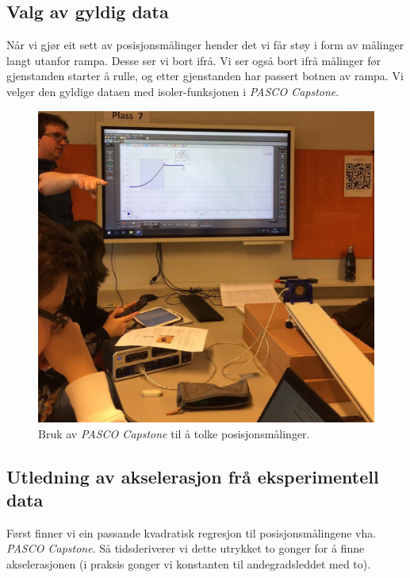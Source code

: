 \documentclass[12pt,a4paper]{article}
\begin{document}
  \subsection{Valg av gyldig data}
  Når vi gjør eit sett av posisjonsmålinger hender det vi får støy i form av målinger langt utanfor
  rampa. Desse ser vi bort ifrå. Vi ser også bort ifrå målinger før gjenstanden starter å rulle,
  og etter gjenstanden har passert botnen av rampa. Vi velger den gyldige dataen med
  isoler-funksjonen i \textit{PASCO Capstone}.

  \begin{figure}
    \begin{center}
      \includegraphics[scale=.1]{fylab1_reg.jpg}
      \caption{Bruk av \textit{PASCO Capstone} til å tolke posisjonsmålinger.}
    \end{center}
  \end{figure}

  \subsection{Utledning av akselerasjon frå eksperimentell data}
  Først finner vi ein passande kvadratisk regresjon til posisjonsmålingene vha.
  \textit{PASCO Capstone}. Så tidsderiverer vi dette utrykket to gonger for å finne
  akselerasjonen (i praksis gonger vi konstanten til andegradsleddet med to).
\end{document}
